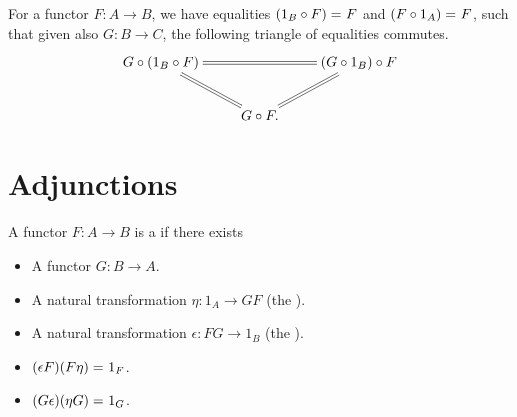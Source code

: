 \documentclass[hott-all.tex]{subfiles}
\begin{document}
\begin{lem}
  For a functor $F:A\to B$, we have equalities $(1_B\circ F) =_{} F$ and $(F\circ 1_A) =_{} F$, such that given also $G:B\to C$, the following triangle of equalities commutes.
  \[ \xymatrix{
    G\circ (1_B \circ F) \ar@{=}[rr] \ar@{=}[dr] &&
    (G\circ 1_B)\circ F \ar@{=}[dl] \\
    & G \circ F.}
  \]
\end{lem}



\section{Adjunctions}


\begin{defn}
  A functor $F:A\to B$ is a 
  if there exists
  \begin{itemize}
  \item A functor $G:B\to A$.
  \item A natural transformation $\eta:1_A \to GF$ (the ).
  \item A natural transformation $\epsilon:FG\to 1_B$ (the ).
  \item $(\epsilon F)(F\eta) =_{} 1_F$.
  \item $(G\epsilon)(\eta G) =_{} 1_G$.
  \end{itemize}
\end{defn}

\end{document}
